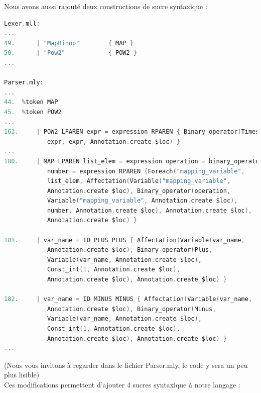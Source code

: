 \documentclass{report}
\begin{document}
    Nous avons aussi rajouté deux constructions de sucre syntaxique :\\

    \begin{lstlisting}[language=C, basicstyle=\ttfamily]
Lexer.mll:
...
49.      | "MapBinop"        { MAP } 
50.      | "Pow2"            { POW2 }
...

Parser.mly:
...
44.  %token MAP
45.  %token POW2
...
163.     | POW2 LPAREN expr = expression RPAREN { Binary_operator(Times, 
            expr, expr, Annotation.create $loc) }
...
180.     | MAP LPAREN list_elem = expression operation = binary_operator
            number = expression RPAREN {Foreach("mapping_variable", 
            list_elem, Affectation(Variable("mapping_variable", 
            Annotation.create $loc), Binary_operator(operation, 
            Variable("mapping_variable", Annotation.create $loc), 
            number, Annotation.create $loc), Annotation.create $loc), 
            Annotation.create $loc) }

181.     | var_name = ID PLUS PLUS { Affectation(Variable(var_name,
            Annotation.create $loc), Binary_operator(Plus,
            Variable(var_name, Annotation.create $loc),
            Const_int(1, Annotation.create $loc),
            Annotation.create $loc), Annotation.create $loc) }

182.     | var_name = ID MINUS MINUS { Affectation(Variable(var_name,
            Annotation.create $loc), Binary_operator(Minus, 
            Variable(var_name, Annotation.create $loc), 
            Const_int(1, Annotation.create $loc), 
            Annotation.create $loc), Annotation.create $loc) }
...
    \end{lstlisting}

    (Nous vous invitons à regarder dans le fichier Parser.mly, le code y sera un peu plus lisible)\\
    Ces modifications permettent d'ajouter 4 sucres syntaxique à notre langage :\\
\end{document}
